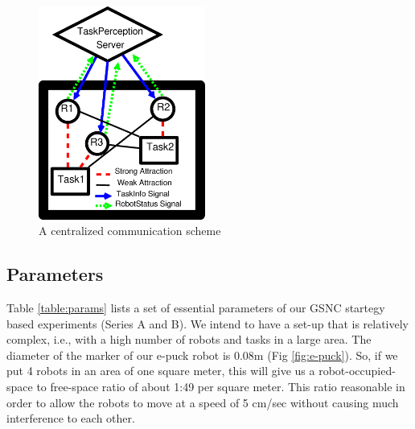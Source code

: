 \documentclass[final,5p,times,twocolumn]{elsarticle}
\begin{document}
\begin{figure}
\centering
\includegraphics[height=7cm, angle=0]{./images/CentralizedComm.eps}
\caption{\small A centralized communication scheme} %
\label{fig:ccm} %
\end{figure}
\subsection{Parameters}
Table \ref{table:params} lists a set of essential parameters of our GSNC startegy based experiments (Series A and B). We intend to have a set-up that is relatively complex, i.e., with a high number of robots and tasks in a large area. The diameter of the marker of our e-puck robot is 0.08m (Fig \ref{fig:e-puck}). So, if we put 4 robots in an area of one square meter, this will give us a robot-occupied-space to free-space ratio of about 1:49 per square meter. This ratio reasonable in order to allow the robots to move at a speed of 5 cm/sec without causing much interference to each other. 
\end{document}
